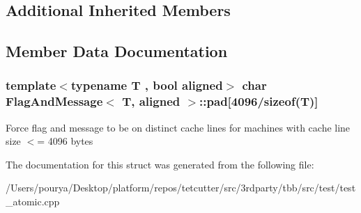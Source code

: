 \subsection*{Additional Inherited Members}


\subsection{Member Data Documentation}
\hypertarget{structFlagAndMessage_a962e3cc5305335a14a58e005f1ea8ed3}{}
\subsubsection[{pad}]{\setlength{\rightskip}{0pt plus 5cm}template$<$typename T , bool aligned$>$ char {\bf Flag\+And\+Message}$<$ T, aligned $>$\+::pad\mbox{[}4096/sizeof(T)\mbox{]}}\label{structFlagAndMessage_a962e3cc5305335a14a58e005f1ea8ed3}
Force flag and message to be on distinct cache lines for machines with cache line size $<$= 4096 bytes 

The documentation for this struct was generated from the following file\+:\begin{DoxyCompactItemize}
\item 
/\+Users/pourya/\+Desktop/platform/repos/tetcutter/src/3rdparty/tbb/src/test/test\+\_\+atomic.\+cpp\end{DoxyCompactItemize}
